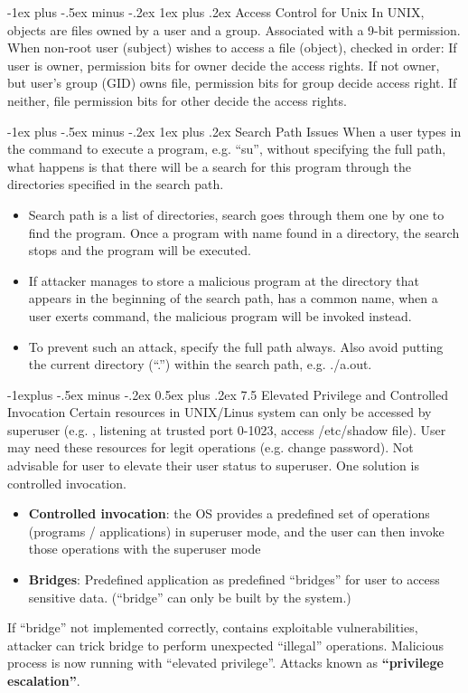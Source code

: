\documentclass[10pt, landscape]{article}
\makeatletter
\renewcommand{\subsection}{\@startsection{subsection}{2}{0mm}%
                                {-1explus -.5ex minus -.2ex}%
                                {0.5ex plus .2ex}%
                                {\normalfont\normalsize\bfseries}}
\renewcommand{\subsubsection}{\@startsection{subsubsection}{3}{0mm}%
                                {-1ex plus -.5ex minus -.2ex}%
                                {1ex plus .2ex}%
                                {\normalfont\small\bfseries}}
\makeatother
\begin{document}
\begin{multicols*}{3}
\subsubsection{Access Control for Unix}
In UNIX, objects are files owned by a user and a group. Associated with a 9-bit permission. When non-root user (subject) wishes to access a file (object), checked in order: If user is owner, permission bits for owner decide the access rights. If not owner, but user’s group (GID) owns file, permission bits for group decide access right. If neither, file permission bits for other decide the access rights.

\subsubsection{Search Path Issues}
When a user types in the command to execute a program, e.g. “su”, without specifying the full path, what happens is that there will be a search for this program through the directories specified in the search path.
\begin{itemize}
\item Search path is a list of directories, search goes through them one by one to find the program. Once a program with name found in a directory, the search stops and the program will be executed.
\item If attacker manages to store a malicious program at the directory that appears in 
the beginning of the search path, has a common name, when a user exerts command, the malicious program will be invoked instead.
\item To prevent such an attack, specify the full path always. Also avoid putting the current directory (“.”) within the search path, e.g. ./a.out. 
\end{itemize}


\subsection{7.5 Elevated Privilege and Controlled Invocation}
Certain resources in UNIX/Linus system can only be accessed by superuser (e.g. , listening at trusted port 0-1023, access /etc/shadow file). User may need these resources for legit operations (e.g. change password). Not advisable for user to elevate their user status to superuser. One solution is controlled invocation.
\begin{itemize}
\item \textbf{Controlled invocation}: the OS provides a predefined set of operations 
(programs / applications) in superuser mode, and the user can then invoke those operations with the superuser mode
\item \textbf{Bridges}: Predefined application as predefined “bridges” for 
user to access sensitive data. (“bridge” can only be built by the system.) 
\end{itemize}
If “bridge” not implemented correctly, contains exploitable vulnerabilities, attacker can trick bridge to perform unexpected “illegal” operations. Malicious process is now running with “elevated privilege”. Attacks known as \textbf{“privilege escalation”}. 


\end{multicols*}
\end{document}
